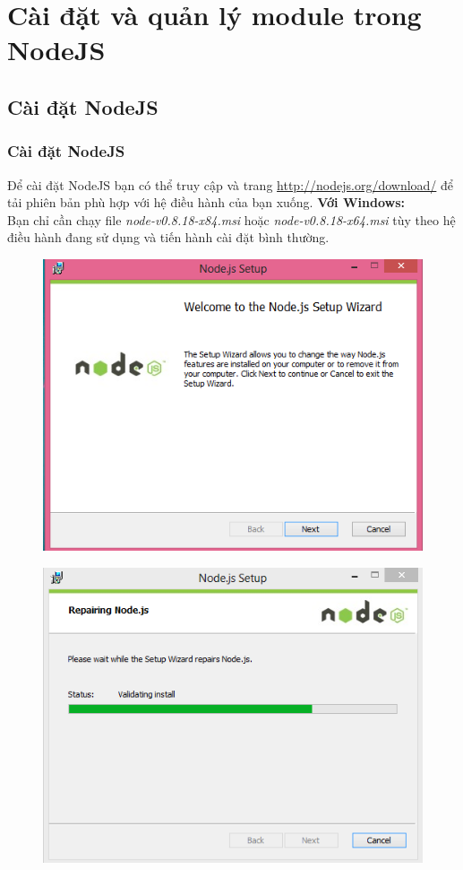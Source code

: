 ﻿\chapter{Cài đặt và quản lý module trong NodeJS}
\label{Cài đặt và quản lý module trong NodeJS}

\section{Cài đặt NodeJS}
	\subsection{Cài đặt NodeJS}
   Để cài đặt NodeJS bạn có thể truy cập và trang \url{http://nodejs.org/download/} để tải phiên bản phù hợp với hệ điều hành của bạn xuống.
      \textbf{Với Windows:} \\
		Bạn chỉ cần chạy file \textit{node-v0.8.18-x84.msi} hoặc \textit{node-v0.8.18-x64.msi} tùy theo hệ điều hành đang sử dụng và tiến hành cài đặt bình thường.

	\begin{figure}[-h]
		\centering
		\includegraphics[scale=0.7]{2_1}
	\end{figure}
	
	\begin{figure}[-h]
		\centering
		\includegraphics[scale=0.7]{2_2}
	\end{figure}

